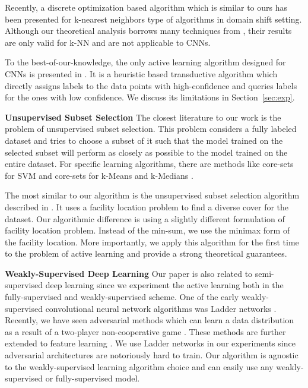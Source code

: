 \documentclass{article}
\begin{document}
Recently, a discrete optimization based algorithm \cite{BerlindU15} which is similar to ours has been presented for k-nearest neighbors type of algorithms in domain shift setting. Although our theoretical analysis borrows many techniques from \cite{BerlindU15}, their results are only valid for k-NN and are not applicable to CNNs.

To the best-of-our-knowledge, the only active learning algorithm designed for CNNs is presented in \cite{wang2016cost}. It is a heuristic based transductive algorithm which directly assigns labels to the data points with high-confidence and queries labels for the ones with low confidence. We discuss its limitations in Section~\ref{sec:exp}.

\noindent\textbf{Unsupervised Subset Selection}
The closest literature to our work is the problem of unsupervised subset selection. This problem considers a fully labeled dataset and tries to choose a subset of it such that the model trained on the selected subset will perform as closely as possible to the model trained on the entire dataset. For specific learning algorithms, there are methods like core-sets for SVM \cite{tsang2005core} and core-sets for k-Means and k-Medians \cite{har2005smaller}. %

The most similar to our algorithm is the unsupervised subset selection algorithm described in \cite{wei2013using}. It uses a facility location problem to find a diverse cover for the dataset. Our algorithmic difference is using a slightly different formulation of facility location problem. Instead of the min-sum, we use the minimax \cite{facility} form of the facility location. More importantly, we apply this algorithm for the first time to the problem of active learning and provide a strong theoretical guarantees.
 
\noindent\textbf{Weakly-Supervised Deep Learning}
Our paper is also related to semi-supervised deep learning since we experiment the active learning both in the fully-supervised and weakly-supervised scheme. 
One of the early weakly-supervised convolutional neural network algorithms was Ladder networks \cite{ladder}. Recently, we have seen adversarial methods which can learn a data distribution as a result of a two-player non-cooperative game \cite{salimans2016improved,gan_original,dcgan}. These methods are further extended to feature learning \cite{ali, bigan}. We use Ladder networks in our experiments since adversarial architectures are notoriously hard to train. Our algorithm is agnostic to the weakly-supervised learning algorithm choice and can easily use any weakly-supervised or fully-supervised model.
\end{document}
